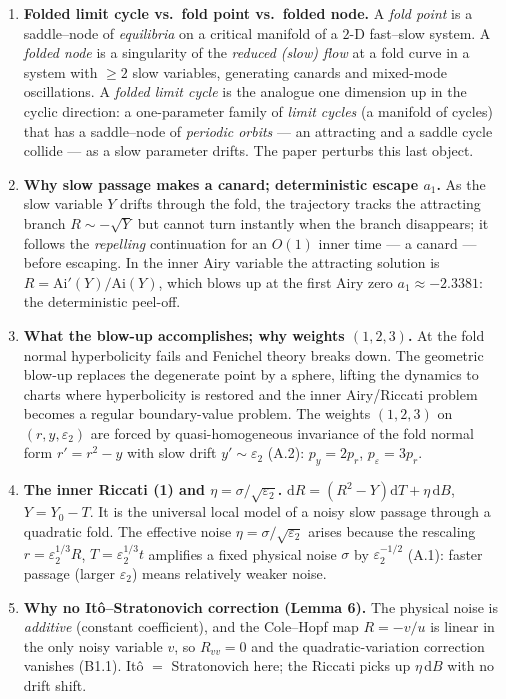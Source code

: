 \documentclass[11pt]{article}
\newcommand{\ep}{\varepsilon_2}
\newcommand{\Ai}{\mathrm{Ai}}
\newcommand{\dd}{\mathrm{d}}
\theoremstyle{definition}
\begin{document}
\begin{enumerate}[leftmargin=1.6em,itemsep=0.5em]
\item \textbf{Folded limit cycle vs.\ fold point vs.\ folded node.}
A \emph{fold point} is a saddle--node of \emph{equilibria} on a critical manifold of a $2$-D
fast--slow system. A \emph{folded node} is a singularity of the \emph{reduced (slow) flow} at a
fold curve in a system with $\ge2$ slow variables, generating canards and mixed-mode oscillations.
A \emph{folded limit cycle} is the analogue one dimension up in the cyclic direction: a
one-parameter family of \emph{limit cycles} (a manifold of cycles) that has a saddle--node of
\emph{periodic orbits} --- an attracting and a saddle cycle collide --- as a slow parameter drifts.
The paper perturbs this last object.

\item \textbf{Why slow passage makes a canard; deterministic escape $a_1$.}
As the slow variable $Y$ drifts through the fold, the trajectory tracks the attracting branch
$R\sim-\sqrt Y$ but cannot turn instantly when the branch disappears; it follows the
\emph{repelling} continuation for an $O(1)$ inner time --- a canard --- before escaping. In the
inner Airy variable the attracting solution is $R=\Ai'(Y)/\Ai(Y)$, which blows up at the first
Airy zero $a_1\approx-2.3381$: the deterministic peel-off.

\item \textbf{What the blow-up accomplishes; why weights $(1,2,3)$.}
At the fold normal hyperbolicity fails and Fenichel theory breaks down. The geometric blow-up
replaces the degenerate point by a sphere, lifting the dynamics to charts where hyperbolicity is
restored and the inner Airy/Riccati problem becomes a regular boundary-value problem. The weights
$(1,2,3)$ on $(r,y,\ep)$ are forced by quasi-homogeneous invariance of the fold normal form
$r'=r^2-y$ with slow drift $y'\sim\ep$ (A.2): $p_y=2p_r$, $p_\varepsilon=3p_r$.

\item \textbf{The inner Riccati (1) and $\eta=\sigma/\sqrt{\ep}$.}
$\dd R=(R^2-Y)\dd T+\eta\,\dd B$, $Y=Y_0-T$. It is the universal local model of a noisy slow
passage through a quadratic fold. The effective noise $\eta=\sigma/\sqrt{\ep}$ arises because the
rescaling $r=\ep^{1/3}R$, $T=\ep^{1/3}t$ amplifies a fixed physical noise $\sigma$ by
$\ep^{-1/2}$ (A.1): faster passage (larger $\ep$) means relatively weaker noise.

\item \textbf{Why no It\^o--Stratonovich correction (Lemma 6).}
The physical noise is \emph{additive} (constant coefficient), and the Cole--Hopf map $R=-v/u$ is
linear in the only noisy variable $v$, so $R_{vv}=0$ and the quadratic-variation correction
vanishes (B1.1). It\^o $=$ Stratonovich here; the Riccati picks up $\eta\,\dd B$ with no drift
shift.


\end{enumerate}
\end{document}
